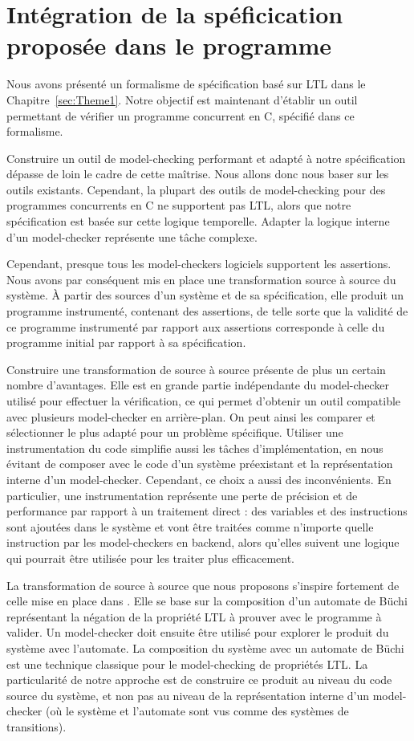 \chapter{Intégration de la spéficication proposée dans le programme}\label{sec:Theme2}

Nous avons présenté un formalisme de spécification basé sur \ac{LTL} dans le
Chapitre~\ref{sec:Theme1}. Notre objectif est maintenant d'établir un outil
permettant de vérifier un programme concurrent en C, spécifié dans ce
formalisme.

Construire un outil de model-checking performant et adapté à notre spécification
dépasse de loin le cadre de cette maîtrise. Nous allons donc nous baser sur les
outils existants. Cependant, la plupart des outils de model-checking pour des
programmes concurrents en C ne supportent pas \ac{LTL}, alors que notre
spécification est basée sur cette logique temporelle. Adapter la logique interne
d'un model-checker représente une tâche complexe.

Cependant, presque tous les model-checkers logiciels supportent les assertions.
Nous avons par conséquent mis en place une transformation source à source du
système. À partir des sources d'un système et de sa spécification, elle produit
un programme instrumenté, contenant des assertions, de telle sorte que la validité de ce
programme instrumenté par rapport aux assertions corresponde à celle du
programme initial par rapport à sa spécification.

Construire une transformation de source à source présente de plus un certain
nombre d'avantages. Elle est en grande partie indépendante du model-checker
utilisé pour effectuer la vérification, ce qui permet d'obtenir un outil
compatible avec plusieurs model-checker en arrière-plan. On peut ainsi les
comparer et sélectionner le
plus adapté pour un problème spécifique. Utiliser une instrumentation du code
simplifie aussi les tâches d'implémentation, en nous évitant de composer avec le
code d'un système préexistant et la représentation interne d'un model-checker.
Cependant, ce choix a aussi des inconvénients. En particulier, une
instrumentation représente une perte de précision et de performance par rapport
à un traitement direct : des variables et des instructions sont ajoutées dans le
système et vont être traitées comme n'importe quelle instruction par les
model-checkers en backend, alors qu'elles suivent une logique qui pourrait être
utilisée pour les traiter plus efficacement.

La transformation de source à source que nous proposons s'inspire fortement de
celle mise en place dans \cite{morse_ltl}. Elle se base sur la composition d'un
automate de Büchi représentant la négation de la propriété \ac{LTL} à prouver
avec le programme à valider. Un model-checker doit ensuite être utilisé pour
explorer le produit du système avec l'automate. La composition du système avec
un automate de Büchi est une technique classique pour le model-checking de
propriétés LTL\cite{25_years_of_model_checking}. La particularité de notre
approche est de construire ce produit au niveau du code source du système, et
non pas au niveau de la représentation interne d'un model-checker (où le système
et l'automate sont vus comme des systèmes de transitions).

